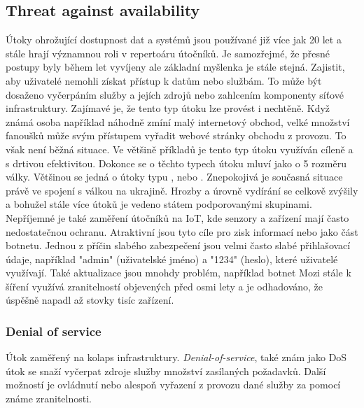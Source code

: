 \subsection{Threat against availability}\label{subsec:threat-against-availability}
Útoky ohrožující dostupnost dat a systémů jsou používané již více jak 20 let a stále hrají významnou roli v repertoáru útočníků.
Je samozřejmé, že přesné postupy byly během let vyvíjeny ale základní myšlenka je stále stejná.
Zajistit, aby uživatelé nemohli získat přístup k datům nebo službám.
To může být dosaženo vyčerpáním služby a jejích zdrojů nebo zahlcením komponenty síťové infrastruktury.
Zajímavé je, že tento typ útoku lze provést i nechtěně.
Když známá osoba například náhodně zmíní malý internetový obchod, velké množství fanoušků může svým přístupem vyřadit webové stránky obchodu z provozu.
To však není běžná situace.
Ve většině příkladů je tento typ útoku využíván cíleně a s drtivou efektivitou.
Dokonce se o těchto typech útoku mluví jako o 5 rozměru války.
Většinou se jedná o útoky typu ,  nebo .
Znepokojivá je současná situace právě ve spojení s válkou na ukrajině.
Hrozby a úrovně vydírání se celkově zvýšily a bohužel stále více útoků je vedeno státem podporovanými skupinami.
Nepříjemné je také zaměření útočníků na \ac{IoT}, kde senzory a zařízení mají často nedostatečnou ochranu.
Atraktivní jsou tyto cíle pro zisk informací nebo jako část botnetu.
Jednou z příčin slabého zabezpečení jsou velmi často slabé přihlašovací údaje, například "admin" (uživatelské jméno) a "1234" (heslo), které uživatelé využívají.
Také aktualizace jsou mnohdy problém, například botnet Mozi stále k šíření využívá zranitelností objevených před osmi lety a je odhadováno, že úspěšně napadl až stovky tisíc zařízení.\cite{Enisa_thread_landscape}


\subsubsection{Denial of service}
Útok zaměřený na kolaps infrastruktury.
\textit{Denial-of-service}, také znám jako \ac{DoS} útok se snaží vyčerpat zdroje služby množství zasílaných požadavků.
Další možností je ovládnutí nebo alespoň vyřazení z provozu dané služby za pomocí známe zranitelnosti.\cite{cisco_most_common_attack}



